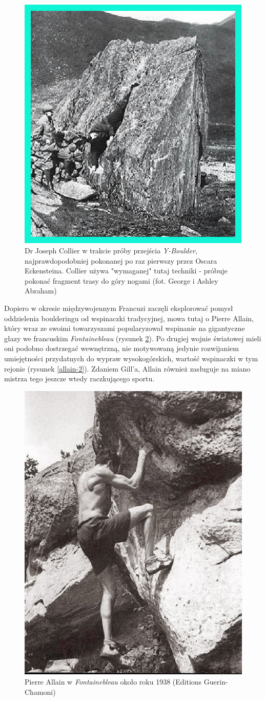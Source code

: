 \documentclass{article}
\begin{document}
\begin{figure}[!htbp]
	\begin{center}
		\includegraphics[width=0.5\linewidth]{images/y-boulder-collier.eps}
	\end{center}
	\caption{Dr Joseph Collier w trakcie próby przejścia \textit{Y-Boulder}, najprawdopodobniej pokonanej po raz pierwszy przez Oscara Eckensteina. Collier używa "wymaganej" tutaj techniki - próbuje pokonać fragment trasy do góry nogami (fot. George i Ashley Abraham) \cite{gill-history}}
	\label{collier}
\end{figure}

Dopiero w okresie międzywojennym Francuzi zaczęli eksplorować pomysł oddzielenia boulderingu od wspinaczki tradycyjnej, mowa tutaj o Pierre Allain, który wraz ze swoimi towarzyszami popularyzował wspinanie na gigantyczne głazy we francuskim \textit{Fontainebleau} (rysunek \ref{allain-1}). Po drugiej wojnie światowej mieli oni podobno dostrzegać wewnętrzną, nie motywowaną jedynie rozwijaniem umiejętności przydatnych do wypraw wysokogórskich, wartość wspinaczki w tym rejonie (rysunek \ref{allain-2}). Zdaniem Gill'a, Allain również zasługuje na miano mistrza tego jeszcze wtedy raczkującego sportu.

\begin{figure}[!htbp]
	\begin{center}
		\includegraphics[width=0.5\linewidth]{images/allain-1.eps}
	\end{center}
	\caption{Pierre Allain w \textit{Fontainebleau} około roku 1938 (Editions Guerin-Chamoni) \cite{gill-history2}}
	\label{allain-1}
\end{figure}
\end{document}
